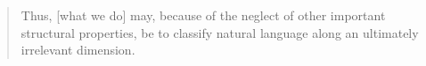 
\begin{quote}
  Thus, [what we do] may, because of the neglect of other important structural properties, be to classify natural language along an ultimately irrelevant dimension. \parencite[436--437]{ParteeEa1990}
\end{quote}

